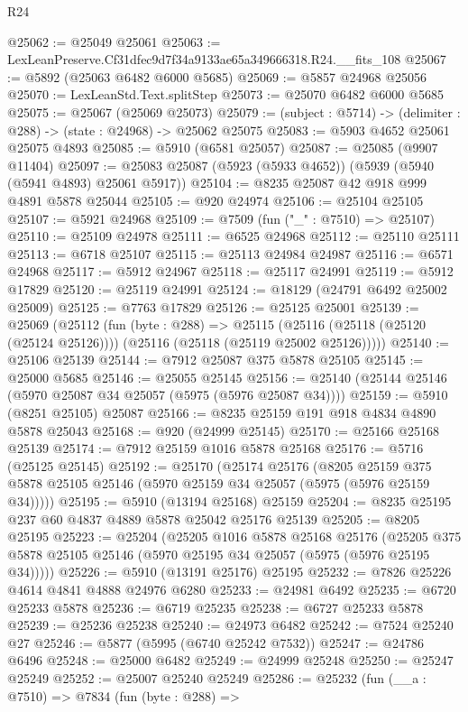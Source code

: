 \begin{lexlean}{R24}
\begin{coremodule}
@25062 := @25049 @25061
@25063 := LexLeanPreserve.Cf31dfec9d7f34a9133ae65a349666318.R24.__fits_108
@25067 := @5892 (@25063 @6482 @6000 @5685)
@25069 := @5857 @24968 @25056
@25070 := LexLeanStd.Text.splitStep
@25073 := @25070 @6482 @6000 @5685
@25075 := @25067 (@25069 @25073)
@25079 := (subject : @5714) -> (delimiter : @288) -> (state : @24968) -> @25062 @25075
@25083 := @5903 @4652 @25061 @25075 @4893
@25085 := @5910 (@6581 @25057)
@25087 := @25085 (@9907 @11404)
@25097 := @25083 @25087 (@5923 (@5933 @4652)) (@5939 (@5940 (@5941 @4893) @25061 @5917))
@25104 := @8235 @25087 @42 @918 @999 @4891 @5878 @25044
@25105 := @920 @24974
@25106 := @25104 @25105
@25107 := @5921 @24968
@25109 := @7509 (fun ("_" : @7510) => @25107)
@25110 := @25109 @24978
@25111 := @6525 @24968
@25112 := @25110 @25111
@25113 := @6718 @25107
@25115 := @25113 @24984 @24987
@25116 := @6571 @24968
@25117 := @5912 @24967
@25118 := @25117 @24991
@25119 := @5912 @17829
@25120 := @25119 @24991
@25124 := @18129 (@24791 @6492 @25002 @25009)
@25125 := @7763 @17829
@25126 := @25125 @25001
@25139 := @25069
    (@25112
      (fun (byte : @288) =>
      @25115 (@25116 (@25118 (@25120 (@25124 @25126)))) (@25116 (@25118 (@25119 @25002 @25126)))))
@25140 := @25106 @25139
@25144 := @7912 @25087 @375 @5878 @25105
@25145 := @25000 @5685
@25146 := @25055 @25145
@25156 := @25140 (@25144 @25146 (@5970 @25087 @34 @25057 (@5975 (@5976 @25087 @34))))
@25159 := @5910 (@8251 @25105) @25087
@25166 := @8235 @25159 @191 @918 @4834 @4890 @5878 @25043
@25168 := @920 (@24999 @25145)
@25170 := @25166 @25168 @25139
@25174 := @7912 @25159 @1016 @5878 @25168
@25176 := @5716 (@25125 @25145)
@25192 := @25170
    (@25174
      @25176
      (@8205 @25159 @375 @5878 @25105 @25146 (@5970 @25159 @34 @25057 (@5975 (@5976 @25159 @34)))))
@25195 := @5910 (@13194 @25168) @25159
@25204 := @8235 @25195 @237 @60 @4837 @4889 @5878 @25042 @25176 @25139
@25205 := @8205 @25195
@25223 := @25204
    (@25205
      @1016
      @5878
      @25168
      @25176
      (@25205 @375 @5878 @25105 @25146 (@5970 @25195 @34 @25057 (@5975 (@5976 @25195 @34)))))
@25226 := @5910 (@13191 @25176) @25195
@25232 := @7826 @25226 @4614 @4841 @4888 @24976 @6280
@25233 := @24981 @6492
@25235 := @6720 @25233 @5878
@25236 := @6719 @25235
@25238 := @6727 @25233 @5878
@25239 := @25236 @25238
@25240 := @24973 @6482
@25242 := @7524 @25240 @27
@25246 := @5877 (@5995 (@6740 @25242 @7532))
@25247 := @24786 @6496
@25248 := @25000 @6482
@25249 := @24999 @25248
@25250 := @25247 @25249
@25252 := @25007 @25240 @25249
@25286 := @25232
    (fun (__a : @7510) =>
    @7834
      (fun (byte : @288) =>

\end{coremodule}
\end{lexlean}
